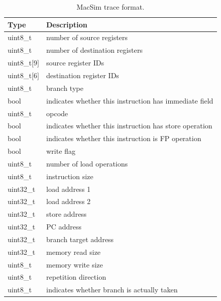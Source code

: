 \ignore
		{
		\begin{table}[htb]
		\begin{footnotesize}
		\begin{center}
		\caption{MacSim trace format.}
		\label{table:trace_format}
		\begin{tabular}{|l|l|} 
		\hline
		Type               & Description \\ \hline 
		uint8\_t           & number of source registers \\ \hline
		uint8\_t           & number of destination registers \\ \hline
		uint8\_t[9]        & source register IDs \\ \hline
		uint8\_t[6]        & destination register IDs \\ \hline
		uint8\_t           & branch type \\ \hline
		bool               & indicates whether this instruction has immediate field \\ \hline
		uint8\_t           & opcode \\ \hline
		bool               & indicates whether this instruction has store operation \\ \hline
		bool               & indicates whether this instruction is FP operation \\ \hline
		bool               & write flag \\ \hline
		uint8\_t           & number of load operations \\ \hline
		uint8\_t           & instruction size \\ \hline
		uint32\_t          & load address 1 \\ \hline
		uint32\_t          & load address 2 \\ \hline
		uint32\_t          & store address \\ \hline
		uint32\_t          & PC address \\ \hline
		uint32\_t          & branch target address \\ \hline
		uint32\_t          & memory read size \\ \hline
		uint8\_t           & memory write size \\ \hline
		uint8\_t           & repetition direction  \\ \hline
		uint8\_t           & indicates whether branch is actually taken \\ \hline

		\end{tabular}
		\end{center}
		\end{footnotesize}
		\end{table}
		}

